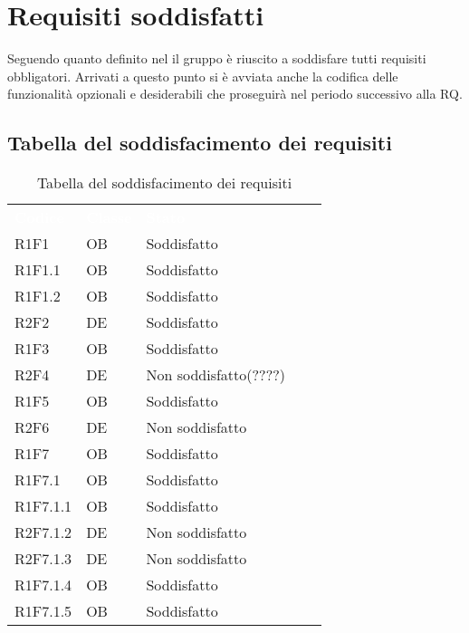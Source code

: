 \section{Requisiti soddisfatti}
Seguendo quanto definito nel  il gruppo è riuscito a soddisfare tutti requisiti obbligatori. Arrivati a questo punto si è avviata anche la codifica delle funzionalità opzionali e desiderabili che proseguirà nel periodo successivo alla RQ. 
\subsection{Tabella del soddisfacimento dei requisiti}
\renewcommand{\arraystretch}{1.5}	 
{
\setlength\arrayrulewidth{1pt}
\begin{longtable}{C{2.5cm} C{2cm} C{3.5cm}}
		\textcolor{white}{\textbf{Codice}} &
		\textcolor{white}{\textbf{Classe}} &
		\textcolor{white}{\textbf{Stato}} 
		\endfirsthead
	    		\\
	    \endfoot
	    \caption{Tabella del soddisfacimento dei requisiti}
	    \endlastfoot

R1F1 & OB & Soddisfatto\\
R1F1.1 & OB & Soddisfatto\\
R1F1.2 & OB & Soddisfatto\\

R2F2 & DE & Soddisfatto\\

R1F3 & OB & Soddisfatto\\

R2F4 & DE & Non soddisfatto(????)\\
R1F5 & OB & Soddisfatto\\
R2F6 & DE & Non soddisfatto\\
R1F7 & OB & Soddisfatto\\
R1F7.1 & OB & Soddisfatto\\
R1F7.1.1 & OB & Soddisfatto\\
R2F7.1.2 & DE & Non soddisfatto\\
R2F7.1.3 & DE & Non soddisfatto\\

R1F7.1.4 & OB & Soddisfatto\\

R1F7.1.5 & OB & Soddisfatto\\


\end{longtable}}
